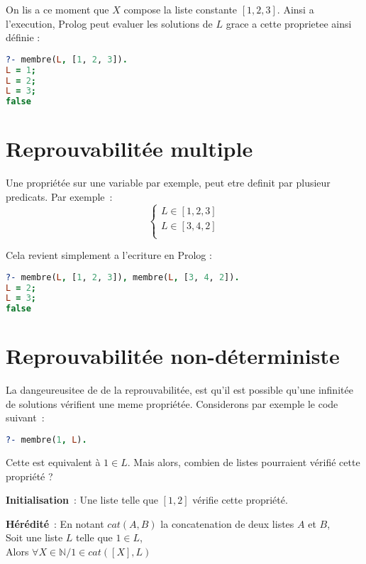 On lis a ce moment que $X$ compose la liste constante $[1, 2, 3]$. Ainsi a
l'execution, Prolog peut evaluer les solutions de $L$ grace a cette proprietee
ainsi définie :

\begin{lstlisting}[language=Prolog]
?- membre(L, [1, 2, 3]).
L = 1;
L = 2;
L = 3;
false
\end{lstlisting}


\section{Reprouvabilitée multiple}

Une propriétée sur une variable par exemple, peut etre definit par plusieur
predicats. Par exemple~:
\[
    \left\{  
    \begin{array}{c}
        L \in [1, 2, 3]\\
        L \in [3, 4, 2]\\
    \end{array}
    \right .
\]

Cela revient simplement a l'ecriture en Prolog :
\begin{lstlisting}[language=Prolog]
?- membre(L, [1, 2, 3]), membre(L, [3, 4, 2]).
L = 2;
L = 3;
false
\end{lstlisting}


\section{Reprouvabilitée non-déterministe}

La dangeureusitee de de la reprouvabilitée, est qu'il est possible qu'une
infinitée de solutions vérifient une meme propriétée. Considerons par exemple
le code suivant~:

\begin{lstlisting}[language=Prolog]
?- membre(1, L).
\end{lstlisting}

Cette est equivalent à $1 \in L$. Mais alors, combien de listes
pourraient vérifié cette propriété ?

\textbf{Initialisation}~: Une liste telle que $[1, 2]$ vérifie cette propriété.

\textbf{Hérédité}~: En notant $cat(A, B)$ la concatenation de deux listes $A$ et
$B$,\\
Soit une liste $L$ telle que $1 \in L$,\\
Alors $\forall X \in \mathbb{N} / 1 \in cat([X], L)$

